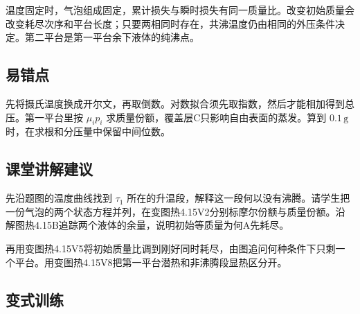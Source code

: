 \documentclass[UTF8,fontset=fandol,a4paper,11pt]{ctexart}
\begin{document}
温度固定时，气泡组成固定，累计损失与瞬时损失有同一质量比。改变初始质量会改变耗尽次序和平台长度；只要两相同时存在，共沸温度仍由相同的外压条件决定。第二平台是第一平台余下液体的纯沸点。



\subsection*{易错点}

先将摄氏温度换成开尔文，再取倒数。对数拟合须先取指数，然后才能相加得到总压。第一平台里按 $\mu_i p_i$ 求质量份额，覆盖层C只影响自由表面的蒸发。算到 $0.1\,\mathrm g$ 时，在求根和分压量中保留中间位数。



\subsection*{课堂讲解建议}

先沿题图的温度曲线找到 $\tau_1$ 所在的升温段，解释这一段何以没有沸腾。请学生把一份气泡的两个状态方程并列，在变图热4.15V2分别标摩尔份额与质量份额。沿解图热4.15B追踪两个液体的余量，说明初始等质量为何A先耗尽。

再用变图热4.15V5将初始质量比调到刚好同时耗尽，由图追问何种条件下只剩一个平台。用变图热4.15V8把第一平台潜热和非沸腾段显热区分开。



\subsection*{变式训练}
\end{document}
